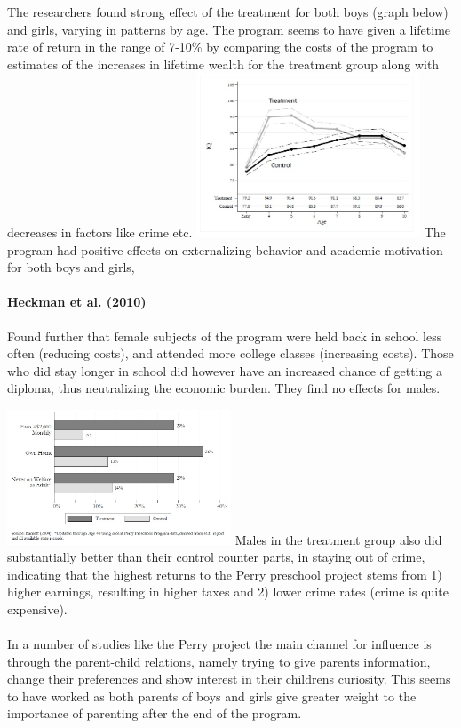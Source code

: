 \documentclass[12pt, a4paper]{article}
\begin{document}
\begin{multicols}{2}
The researchers found strong effect of the treatment for both boys (graph below) and girls, varying in patterns by age. The program seems to have given a lifetime rate of return in the range of 7-10\% by comparing the costs of the program to estimates of the increases in lifetime wealth for the treatment group along with decreases in factors like crime etc.
\includegraphics[width = 0.5\textwidth]{iq.jpg}
The program had positive effects on externalizing behavior and academic motivation for both boys and girls,


\paragraph{Heckman et al. (2010)} Found further that female subjects of the program were held back in school less often (reducing costs), and attended more college classes (increasing costs). Those who did stay longer in school did however have an increased chance of getting a diploma, thus neutralizing the economic burden. They find no effects for males.

\includegraphics[width = 0.5\textwidth]{perry2.jpg}
Males in the treatment group also did substantially better than their control counter parts, in staying out of crime, indicating that the highest returns to the Perry preschool project stems from 1) higher earnings, resulting in higher taxes and 2) lower crime rates (crime is quite expensive).
\\ \\
In a number of studies like the Perry project the main channel for influence is through the parent-child relations, namely trying to give parents information, change their preferences and show interest in their childrens curiosity. This seems to have worked as both parents of boys and girls give greater weight to the importance of parenting after the end of the program.


\end{multicols}
\end{document}
